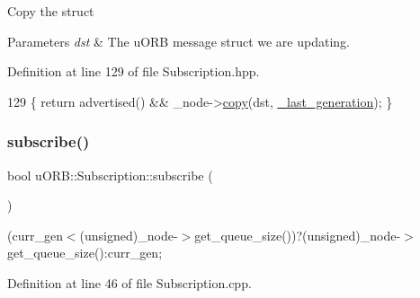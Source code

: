 Copy the struct 
\begin{DoxyParams}{Parameters}
{\em dst} & The u\+O\+RB message struct we are updating. \\
\hline
\end{DoxyParams}


Definition at line 129 of file Subscription.\+hpp.


\begin{DoxyCode}
129 \{ \textcolor{keywordflow}{return} advertised() && \_node->\hyperlink{classuORB_1_1DeviceNode_a89d9a792e1e38e04c65baba20f29d780}{copy}(dst, \hyperlink{classuORB_1_1Subscription_a994ab022fce2eb1c47b62444d9c5cca9}{\_last\_generation}); \}
\end{DoxyCode}
\mbox{\label{classuORB_1_1Subscription_acb0fbd4b56d5e3c8edca15206e110223}} 
\subsubsection{\texorpdfstring{subscribe()}{subscribe()}}
{\footnotesize\ttfamily bool u\+O\+R\+B\+::\+Subscription\+::subscribe (\begin{DoxyParamCaption}{ }\end{DoxyParamCaption})}

(curr\+\_\+gen$<$(unsigned)\+\_\+node-\/$>$get\+\_\+queue\+\_\+size())?(unsigned)\+\_\+node-\/$>$get\+\_\+queue\+\_\+size()\+:curr\+\_\+gen; 

Definition at line 46 of file Subscription.\+cpp.


